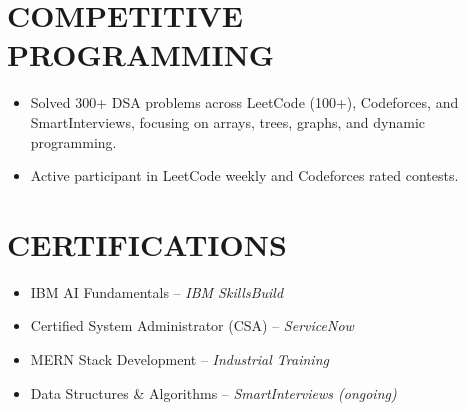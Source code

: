 \documentclass[letterpaper,11pt]{article}
\begin{document}
\section*{COMPETITIVE PROGRAMMING}
\begin{itemize}
\item Solved 300+ DSA problems across LeetCode (100+), Codeforces, and SmartInterviews, focusing on arrays, trees, graphs, and dynamic programming.
\item Active participant in LeetCode weekly and Codeforces rated contests.
\end{itemize}

\section*{CERTIFICATIONS}
\begin{itemize}
\item IBM AI Fundamentals -- \textit{IBM SkillsBuild}
\item Certified System Administrator (CSA) -- \textit{ServiceNow}
\item MERN Stack Development -- \textit{Industrial Training}
\item Data Structures \& Algorithms -- \textit{SmartInterviews (ongoing)}
\end{itemize}
\end{document}
